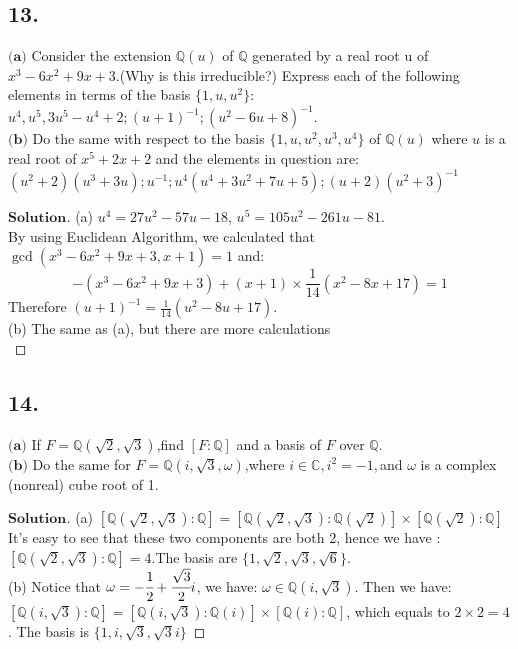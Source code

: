 \documentclass[a4paper, 11pt]{article}
\newenvironment{solution}
{\renewcommand\qedsymbol{$ $}\begin{proof}[$\mathbf{Solution}$]}
  {\end{proof}}
\begin{document}
 \subsection*{13.}
 $\textbf{(a)}$ Consider the extension $\mathbb{Q}(u)$ of $\mathbb{Q}$ generated by a real root u
 of $x^3-6x^2+9x+3$.(Why is this irreducible?) Express each of the following elements
 in terms of the basis $\{1,u,u^2\}$:$u^4, u^5, 3u^5-u^4+2;(u+1)^{-1};(u^2-6u+8)^{-1}.$\\
 $\textbf{(b)}$ Do the same with respect to the basis $\{1,u,u^2,u^3,u^4\}$ of $\mathbb{Q}(u)$ where
 $u$ is a real root of $x^{5}+2x+2$ and the elements in question are: 
 $(u^2+2)(u^3+3u);u^{-1};u^{4}(u^{4}+3u^{2}+7u+5);(u+2)(u^2+3)^{-1}$
 
 \begin{solution}
         (a) $u^4=27u^2-57u-18$, $u^5=105u^2-261u-81$.\\
         By using Euclidean Algorithm, we calculated that $\gcd(x^3-6x^2+9x+3,x+1)=1$ and:
         $$
         -(x^3-6x^2+9x+3)+(x+1)\times\frac{1}{14}(x^2-8x+17)=1
         $$ Therefore $(u+1)^{-1}=\frac{1}{14}(u^2-8u+17)$.\\
         (b) The same as (a), but there are more calculations\\
 \end{solution}

 \subsection*{14.}
 $\textbf{(a)}$ If $F=\mathbb{Q}(\sqrt{2}, \sqrt{3})$,find $[F:\mathbb{Q}]$ and a basis of $F$ over $\mathbb{Q}$.\\
 $\textbf{(b)}$ Do the same for $F=\mathbb{Q}(i,\sqrt{3}, \omega)$,where $i\in \mathbb{C}, i^2=-1,$and $\omega$
 is a complex (nonreal) cube root of 1.

 \begin{solution}
         (a) $[\mathbb{Q}(\sqrt{2}, \sqrt{3}):\mathbb{Q}]=[\mathbb{Q}(\sqrt{2},\sqrt{3}):\mathbb{Q}(\sqrt{2})]
         \times [\mathbb{Q}(\sqrt{2}):\mathbb{Q}]$ It's easy to see that these two components are both 2, hence 
         we have : $[\mathbb{Q}(\sqrt{2}, \sqrt{3}):\mathbb{Q}]=4$.The basis are $\{1,\sqrt{2}, \sqrt{3},\sqrt{6} \}$.\\
         (b) Notice that $\omega=-\cfrac{1}{2}+\cfrac{\sqrt{3}}{2}i$, we have: $\omega\in \mathbb{Q}(i,\sqrt{3})$.
         Then we have:$[\mathbb{Q}(i,\sqrt{3}):\mathbb{Q}]=[\mathbb{Q}(i,\sqrt{3}):\mathbb{Q}(i)]\times 
         [\mathbb{Q}(i):\mathbb{Q}]$, which equals to $2\times2=4$. The basis is $\{1, i,\sqrt{3}, \sqrt{3}i\}$

 \end{solution}
\end{document}
